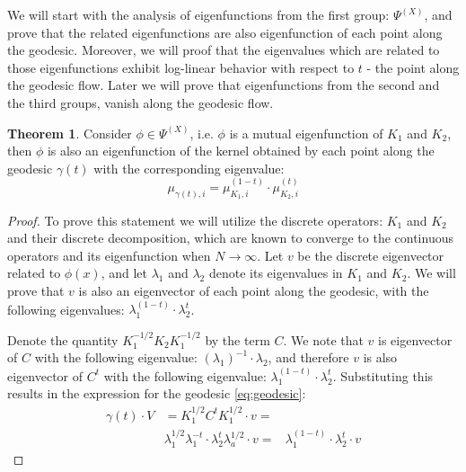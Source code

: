 \documentclass[]{article}
\theoremstyle{definition}
\newtheorem{theorem}{Theorem}
\begin{document}
	We will start with the analysis of eigenfunctions from the first group: $\Psi^{(X)}$, and prove that the related eigenfunctions are also eigenfunction of each point along the geodesic. Moreover, we will proof that the eigenvalues which are related to those eigenfunctions exhibit log-linear behavior with respect to $t$ - the point along the geodesic flow.
	Later we will prove that eigenfunctions from the second and the third groups, vanish along the geodesic flow.
	
	\begin{theorem}
		Consider $\phi \in \Psi^{(X)}$, i.e. $\phi$ is a mutual eigenfunction of $K_1$ and $K_2$, then $\phi$ is also an eigenfunction of the kernel obtained by each point along the geodesic $\gamma(t)$ with the corresponding eigenvalue:
		\begin{equation}
		\mu_{\gamma(t),i} = \mu_{K_1,i}^{(1-t)} \cdot \mu_{K_2,i}^{(t)} 
		\label{eq:CommonEigenVals}
		\end{equation}
	\end{theorem}
	
	\begin{proof}
		To prove this statement we will utilize the discrete operators: $K_1$ and $K_2$ and their discrete decomposition, which are known to converge to the continuous operators and its eigenfunction when $N \rightarrow \infty $. 
		Let $v$ be the discrete eigenvector related to $\phi(x)$, and let $\lambda_1$ and  $\lambda_2$ denote its eigenvalues in $K_1$ and $K_2$. We will prove that $v$ is also an eigenvector of each point along the geodesic, with the following eigenvalues:  $\lambda_1^{(1-t)}\cdot \lambda_2^t$.
		
		Denote the quantity $K_1^{-1/2}K_2K_1^{-1/2}$ by the term $C$. We note that $v$ is eigenvector of $C$ with the following eigenvalue: $(\lambda_1)^{-1}\cdot\lambda_2$, and therefore $v$ is also eigenvector of $C^t$ with the following eigenvalue: $\lambda_1^{(1-t)} \cdot \lambda_2^{t}$.
		Substituting this results in the expression for the geodesic \ref{eq:geodesic}:
		\begin{equation}
		\begin{aligned}
			\gamma(t) \cdot V &= K_1^{1/2}C^tK_1^{1/2} \cdot v =\\
			&	\lambda_1^{1/2}\lambda_1^{-t}\cdot\lambda_2^t \lambda_a^{1/2}\cdot v= 
			& \lambda_1^{(1-t)} \cdot \lambda_2^{t}\cdot v
		\end{aligned}
		\end{equation}
	\end{proof}
\end{document}

